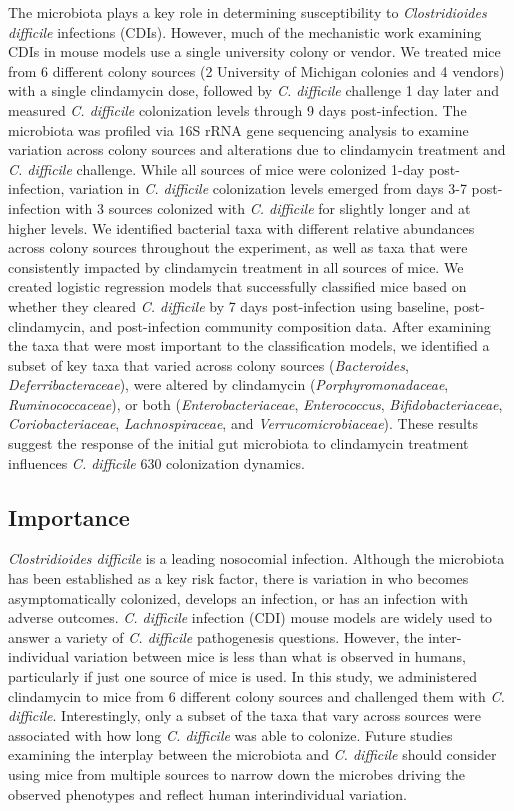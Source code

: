 \documentclass[11pt,]{article}
\begin{document}
The microbiota plays a key role in determining susceptibility to
\emph{Clostridioides difficile} infections (CDIs). However, much of the
mechanistic work examining CDIs in mouse models use a single university
colony or vendor. We treated mice from 6 different colony sources (2
University of Michigan colonies and 4 vendors) with a single clindamycin
dose, followed by \emph{C. difficile} challenge 1 day later and measured
\emph{C. difficile} colonization levels through 9 days post-infection.
The microbiota was profiled via 16S rRNA gene sequencing analysis to
examine variation across colony sources and alterations due to
clindamycin treatment and \emph{C. difficile} challenge. While all
sources of mice were colonized 1-day post-infection, variation in
\emph{C. difficile} colonization levels emerged from days 3-7
post-infection with 3 sources colonized with \emph{C. difficile} for
slightly longer and at higher levels. We identified bacterial taxa with
different relative abundances across colony sources throughout the
experiment, as well as taxa that were consistently impacted by
clindamycin treatment in all sources of mice. We created logistic
regression models that successfully classified mice based on whether
they cleared \emph{C. difficile} by 7 days post-infection using
baseline, post-clindamycin, and post-infection community composition
data. After examining the taxa that were most important to the
classification models, we identified a subset of key taxa that varied
across colony sources (\emph{Bacteroides}, \emph{Deferribacteraceae}),
were altered by clindamycin (\emph{Porphyromonadaceae},
\emph{Ruminococcaceae}), or both (\emph{Enterobacteriaceae},
\emph{Enterococcus}, \emph{Bifidobacteriaceae},
\emph{Coriobacteriaceae}, \emph{Lachnospiraceae}, and
\emph{Verrucomicrobiaceae}). These results suggest the response of the
initial gut microbiota to clindamycin treatment influences \emph{C.
difficile} 630 colonization dynamics.

\subsection{Importance}\label{importance}

\emph{Clostridioides difficile} is a leading nosocomial infection.
Although the microbiota has been established as a key risk factor, there
is variation in who becomes asymptomatically colonized, develops an
infection, or has an infection with adverse outcomes. \emph{C.
difficile} infection (CDI) mouse models are widely used to answer a
variety of \emph{C. difficile} pathogenesis questions. However, the
inter-individual variation between mice is less than what is observed in
humans, particularly if just one source of mice is used. In this study,
we administered clindamycin to mice from 6 different colony sources and
challenged them with \emph{C. difficile}. Interestingly, only a subset
of the taxa that vary across sources were associated with how long
\emph{C. difficile} was able to colonize. Future studies examining the
interplay between the microbiota and \emph{C. difficile} should consider
using mice from multiple sources to narrow down the microbes driving the
observed phenotypes and reflect human interindividual variation.
\end{document}
